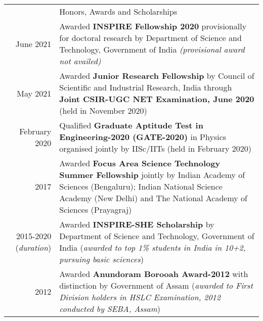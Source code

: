 \documentclass[a4paper, 11pt]{article}
\newcommand{\headingfont}{\Large\color{Bittersweet}}
\newenvironment{SectionTable}[1]{
	\renewcommand*{\arraystretch}{1.7}
	\setlength{\tabcolsep}{10pt}
	\begin{longtable}{Rp{5.2in}} & #1 \\}
{\end{longtable}\vspace{-.3cm}}
\begin{document}









\begin{SectionTable}{\headingfont Honors, Awards and Scholarships}
June 2021 & 
Awarded \textbf{INSPIRE Fellowship 2020} provisionally for doctoral research by Department of Science and Technology, Government of India \textit{(provisional award not availed)}
 \\

May 2021 &
Awarded \textbf{Junior Research Fellowship} by Council of Scientific and
Industrial Research, India through \textbf{Joint CSIR-UGC NET Examination, June 2020}
(held in November 2020) \\ %


February 2020 &
Qualified \textbf{Graduate Aptitude Test in Engineering-2020 (GATE-2020)} in Physics organised jointly by IISc/IITs (held in February 2020) \\

2017 &
Awarded \textbf{Focus Area Science Technology Summer Fellowship} jointly by Indian Academy of Sciences (Bengaluru); Indian National Science Academy (New Delhi) and The National Academy of Sciences (Prayagraj) \\

2015-2020 (\textit{duration})&
Awarded \textbf{INSPIRE-SHE Scholarship} by Department of Science and Technology, Government of India (\textit{awarded to top 1\% students in India in 10+2, pursuing basic sciences}) \\

2012 &
Awarded \textbf{Anundoram Borooah Award-2012} with distinction by Government of Assam (\textit{awarded to First Division holders in HSLC Examination, 2012 conducted by SEBA, Assam})

\end{SectionTable}
\end{document}
